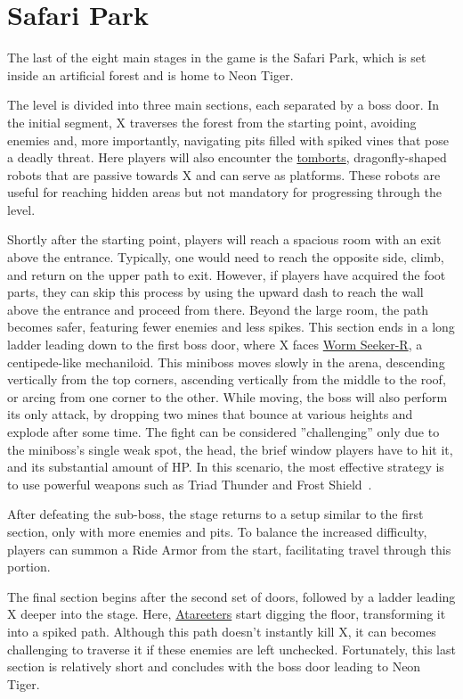 \section{Safari Park}
The last of the eight main stages in the game is the Safari Park, which is set inside an artificial forest and is home to Neon Tiger.

The level is divided into three main sections, each separated by a boss door. In the initial segment, X traverses the forest from the starting point, avoiding enemies and, more importantly, navigating pits filled with spiked vines that pose a deadly threat. Here players will also encounter the \hyperlink{enem:Tombort}{tomborts}, dragonfly-shaped robots that are passive towards X and can serve as platforms. These robots are useful for reaching hidden areas but not mandatory for progressing through the level.

Shortly after the starting point, players will reach a spacious room with an exit above the entrance. Typically, one would need to reach the opposite side, climb, and return on the upper path to exit. However, if players have acquired the foot parts, they can skip this process by using the upward dash to reach the wall above the entrance and proceed from there. Beyond the large room, the path becomes safer, featuring fewer enemies and less spikes. This section ends in a long ladder leading down to the first boss door, where X faces \hyperlink{miniboss:Worm_seeker-r}{Worm Seeker-R}, a centipede-like mechaniloid. This miniboss moves slowly in the arena, descending vertically from the top corners, ascending vertically from the middle to the roof, or arcing from one corner to the other. While moving, the boss will also perform its only attack, by dropping two mines that bounce at various heights and explode after some time. The fight can be considered ''challenging'' only due to the miniboss's single weak spot, the head, the brief window players have to hit it, and its substantial amount of HP. In this scenario, the most effective strategy is to use powerful weapons such as Triad Thunder and Frost Shield~\cite{wiki:Worm_seeker}.

After defeating the sub-boss, the stage returns to a setup similar to the first section, only with more enemies and pits. To balance the increased difficulty, players can summon a Ride Armor from the start, facilitating travel through this portion.

The final section begins after the second set of doors, followed by a ladder leading X deeper into the stage. Here, \hyperlink{enem:Atareeter}{Atareeters} start digging the floor, transforming it into a spiked path. Although this path doesn't instantly kill X, it can becomes challenging to traverse it if these enemies are left unchecked. Fortunately, this last section is relatively short and concludes with the boss door leading to Neon Tiger.

